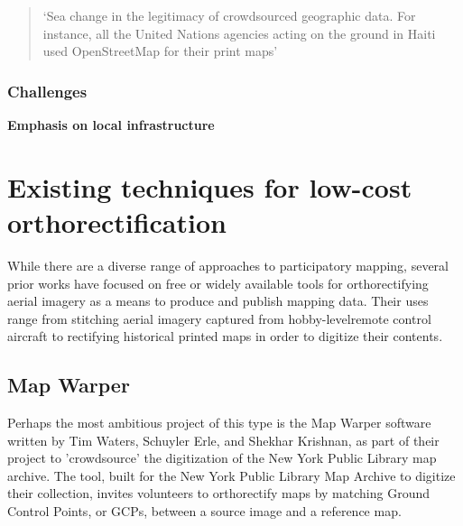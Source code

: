 \documentclass[11pt,oneside,notitlepage]{report}
\begin{document}

\begin{quote}`Sea change in the legitimacy of crowdsourced geographic data. For instance, all the United Nations agencies acting on the ground in Haiti used OpenStreetMap for their print maps'\end{quote} \cite{glennon2010grassrootscrisis}

\subsubsection{Challenges}
\textbf{Emphasis on local infrastructure}

\section{Existing techniques for low-cost orthorectification}
\label{sec:existingtechniques}

While there are a diverse range of approaches to participatory mapping, several prior works have focused on free or widely available tools for orthorectifying aerial imagery as a means to produce and publish mapping data. Their uses range from stitching aerial imagery captured from hobby-levelremote control aircraft to rectifying historical printed maps in order to digitize their contents.

\subsection{Map Warper}
\label{subsec:mapwarper}

Perhaps the most ambitious project of this type is the Map Warper software written by Tim Waters, Schuyler Erle, and Shekhar Krishnan, as part of their project to 'crowdsource' the digitization of the New York Public Library map archive. \cite{waters2009warper} The tool, built for the New York Public Library Map Archive to digitize their collection, invites volunteers to orthorectify maps by matching Ground Control Points, or GCPs, between a source image and a reference map. 
\end{document}
